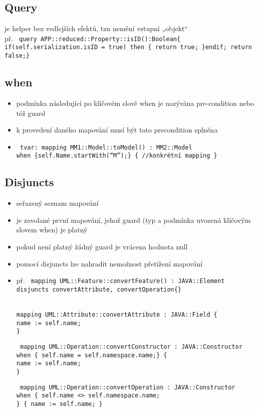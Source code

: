 \documentclass[11pt,a4paper]{article}   	%
\begin{document}
\subsection{Query }
je helper bez vedlejších efektů, tzn nemění vstupní „objekt“\\
př. \texttt {
				query APP::reduced::Property::isID():Boolean\{
		if(self.serialization.isID = true) then \{ return true; \}endif; return
		false;\} }

\subsection{when}
\begin{itemize}
  	\item 	podmínka následující po klíčovém slově when je nazývána
			pre-condition nebo též guard
	\item	k provedení daného mapování musí být tato precondition splněna
	\item	\texttt { 
					tvar: mapping MM1::Model::toModel() : MM2::Model \\
					when \{self.Name.startWith(“M”);\} \{ //konkrétní mapping \}
			}			 
\end{itemize}

\subsection{Disjuncts}
	\begin {itemize}
	  \item 	seřazený seznam mapování
	  \item 	je zavolané první mapování, jehož guard (typ a podmínka uvozená
	  			klíčovým slovem when) je platný
	  \item 	pokud není platný žádný guard je vrácena hodnota null
	  \item 	pomocí disjuncts lze nahradit nemožnost přetížení mapování
	  \item 	př.	\texttt { 
	  					mapping UML::Feature::convertFeature() : JAVA::Element \\ disjuncts
	  					convertAttribute, convertOperation\{\}
					}

					\texttt{	
						\\mapping UML::Attribute::convertAttribute : JAVA::Field \{\\
						name := self.name;\\ \}
					}

					\texttt{	
						mapping UML::Operation::convertConstructor : JAVA::Constructor \\
						when \{ self.name = self.namespace.name;\} \{ \\name := self.name; \\ \}
					}


					\texttt{
						mapping UML::Operation::convertOperation : JAVA::Constructor \\ when \{
						self.name <> self.namespace.name;\\ \} \{ name := self.name; \}
					}
	\end{itemize}
\end{document}
